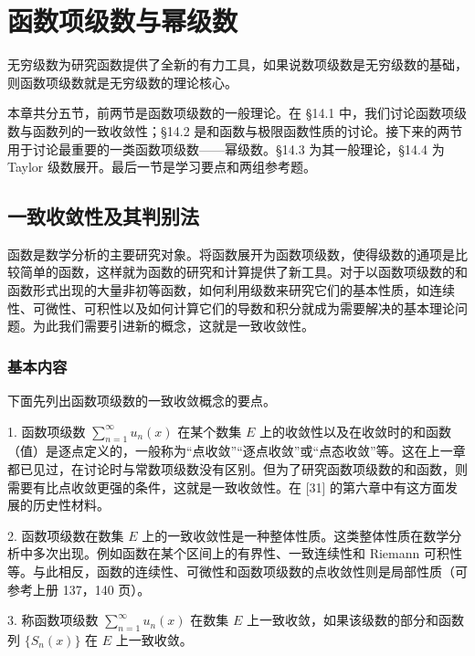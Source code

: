 \chapter{函数项级数与幂级数}


无穷级数为研究函数提供了全新的有力工具，如果说数项级数是无穷级数的基础，则函数项级数就是无穷级数的理论核心。

本章共分五节，前两节是函数项级数的一般理论。在 §14.1 中，我们讨论函数项级数与函数列的一致收敛性；§14.2 是和函数与极限函数性质的讨论。接下来的两节用于讨论最重要的一类函数项级数——幂级数。§14.3 为其一般理论，§14.4 为 Taylor 级数展开。最后一节是学习要点和两组参考题。

\section{一致收敛性及其判别法}

函数是数学分析的主要研究对象。将函数展开为函数项级数，使得级数的通项是比较简单的函数，这样就为函数的研究和计算提供了新工具。对于以函数项级数的和函数形式出现的大量非初等函数，如何利用级数来研究它们的基本性质，如连续性、可微性、可积性以及如何计算它们的导数和积分就成为需要解决的基本理论问题。为此我们需要引进新的概念，这就是一致收敛性。

\subsection{基本内容}

下面先列出函数项级数的一致收敛概念的要点。

1. 函数项级数 $\displaystyle\sum_{n=1}^{\infty}u_n(x)$ 在某个数集 $E$ 上的收敛性以及在收敛时的和函数（值）是逐点定义的，一般称为“点收敛”“逐点收敛”或“点态收敛”等。这在上一章都已见过，在讨论时与常数项级数没有区别。但为了研究函数项级数的和函数，则需要有比点收敛更强的条件，这就是一致收敛性。在 [31] 的第六章中有这方面发展的历史性材料。

2. 函数项级数在数集 $E$ 上的一致收敛性是一种整体性质。这类整体性质在数学分析中多次出现。例如函数在某个区间上的有界性、一致连续性和 Riemann 可积性等。与此相反，函数的连续性、可微性和函数项级数的点收敛性则是局部性质（可参考上册 137，140 页）。

3. 称函数项级数 $\displaystyle\sum_{n=1}^{\infty}u_n(x)$ 在数集 $E$ 上一致收敛，如果该级数的部分和函数列 $\{S_n(x)\}$ 在 $E$ 上一致收敛。

